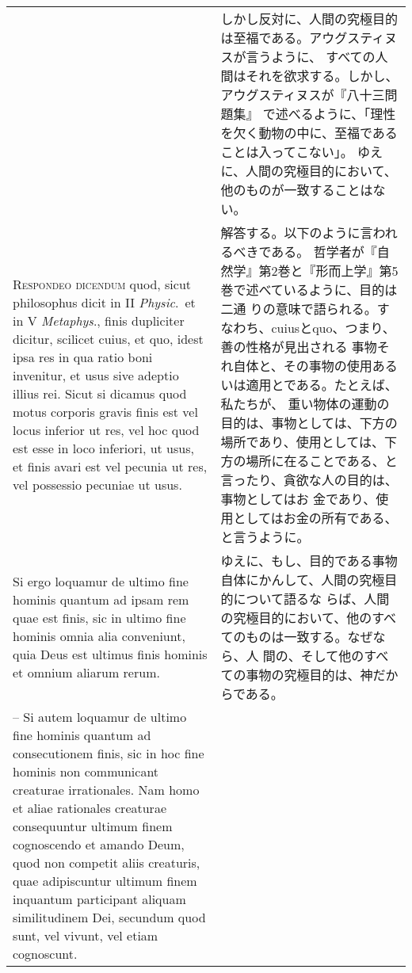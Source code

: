 \documentclass[10pt]{jsarticle} %
\begin{document}
\begin{longtable}{p{21em}p{21em}}
&

しかし反対に、人間の究極目的は至福である。アウグスティヌスが言うように、
 すべての人間はそれを欲求する。しかし、アウグスティヌスが『八十三問題集』
 で述べるように、「理性を欠く動物の中に、至福であることは入ってこない」。
 ゆえに、人間の究極目的において、他のものが一致することはない。


\\


{\scshape Respondeo dicendum} quod, sicut philosophus
dicit in II {\itshape Physic}.~et in V {\itshape Metaphys}., finis dupliciter dicitur,
scilicet cuius, et quo, idest ipsa res in qua ratio boni invenitur, et
usus sive adeptio illius rei. Sicut si dicamus quod motus corporis
gravis finis est vel locus inferior ut res, vel hoc quod est esse in
loco inferiori, ut usus, et finis avari est vel pecunia ut res, vel
possessio pecuniae ut usus. 


&

解答する。以下のように言われるべきである。
哲学者が『自然学』第2巻と『形而上学』第5巻で述べているように、目的は二通
 りの意味で語られる。すなわち、cuiusとquo、つまり、善の性格が見出される
 事物それ自体と、その事物の使用あるいは適用とである。たとえば、私たちが、
重い物体の運動の目的は、事物としては、下方の場所であり、使用としては、下
 方の場所に在ることである、と言ったり、貪欲な人の目的は、事物としてはお
 金であり、使用としてはお金の所有である、と言うように。

\\



Si ergo loquamur de ultimo fine hominis
quantum ad ipsam rem quae est finis, sic in ultimo fine hominis omnia
alia conveniunt, quia Deus est ultimus finis hominis et omnium aliarum
rerum. 


&

ゆえに、もし、目的である事物自体にかんして、人間の究極目的について語るな
 らば、人間の究極目的において、他のすべてのものは一致する。なぜなら、人
 間の、そして他のすべての事物の究極目的は、神だからである。

\\





-- Si autem loquamur de ultimo fine hominis quantum ad consecutionem
finis, sic in hoc fine hominis non communicant creaturae
irrationales. Nam homo et aliae rationales creaturae consequuntur
ultimum finem cognoscendo et amando Deum, quod non competit aliis
creaturis, quae adipiscuntur ultimum finem inquantum participant aliquam
similitudinem Dei, secundum quod sunt, vel vivunt, vel etiam cognoscunt.



\end{longtable}
\end{document}
